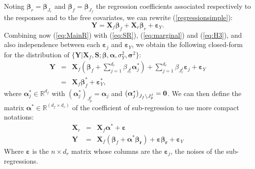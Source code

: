 \documentclass[12pt,a4paper]{report}
\begin{document}
Noting $\boldsymbol{\beta}_r=\boldsymbol{\beta}_{J_r}$ and $\boldsymbol{\beta}_f=\boldsymbol{\beta}_{J_f}$ the regression coefficients associated respectively to the responses and to the free covariates, we can rewrite (\ref{regressionsimple}):
\begin{equation}
			\boldsymbol{Y} %
			=\boldsymbol{X}_f\boldsymbol{\beta}_f+\boldsymbol{X}_r\boldsymbol{\beta}_r+\boldsymbol{\varepsilon}_Y. \label{eq:MainR}
\end{equation}
Combining now (\ref{eq:MainR}) with (\ref{eq:SR}), (\ref{eq:marginal}) and (\ref{eq:H3}), and also independence between each $\boldsymbol{\varepsilon}_j$ and $\boldsymbol{\varepsilon}_Y$, we obtain the following closed-form for the distribution of $\{\boldsymbol{Y} |\boldsymbol{X}_f,\boldsymbol{S};\boldsymbol{\beta},\boldsymbol{\alpha},\sigma_Y^2,\boldsymbol{\sigma}^2\}$:
\begin{eqnarray}
	\boldsymbol{Y}%
	&=&\boldsymbol{X}_f (\boldsymbol{\beta}_f+ \sum_{j =1}^{d_r}\beta_{J_r^j}\boldsymbol{\alpha}_j^*)+  \sum_{j =1}^{d_r}\beta_{J_r^j}\boldsymbol{\varepsilon}_j+\boldsymbol{\varepsilon}_Y \label{eq:Trueexpl} \\
	&=&\boldsymbol{X}_f\boldsymbol{\beta}_f^*+\boldsymbol{\varepsilon}_Y^*,\label{eq:modexpl}
\end{eqnarray}
where $\boldsymbol{\alpha}^*_j \in \mathbb{R}^{d_f}$ with $(\boldsymbol{\alpha}_j^*)_{J_p^j}=\boldsymbol{\alpha}_j $ and $(\boldsymbol{\alpha}_j^*)_{J_f\setminus J_p^j}=\bf 0 $. We can then define the matrix $\boldsymbol{\alpha}^* \in \mathbb{R}^{(d_f \times d_r)}$ of the coefficient of sub-regression to use more compact notations:
\begin{eqnarray}
	\boldsymbol{X}_r %
	&=&\boldsymbol{X}_f\boldsymbol{\alpha}^*+\boldsymbol{\varepsilon} \nonumber \\
	\boldsymbol{Y}%
	&=&\boldsymbol{X}_f (\boldsymbol{\beta}_f+ \boldsymbol{\alpha}^*\boldsymbol{\beta_{r}})+ \boldsymbol{\varepsilon}\boldsymbol{\beta_{r}}+\boldsymbol{\varepsilon}_Y \label{eq:Trueexpl2}
\end{eqnarray} 
Where $\boldsymbol{\varepsilon}$ is the $n\times d_r$ matrix whose columns are the $\boldsymbol{\varepsilon}_j$, the noises of the sub-regressions.\\
\end{document}
